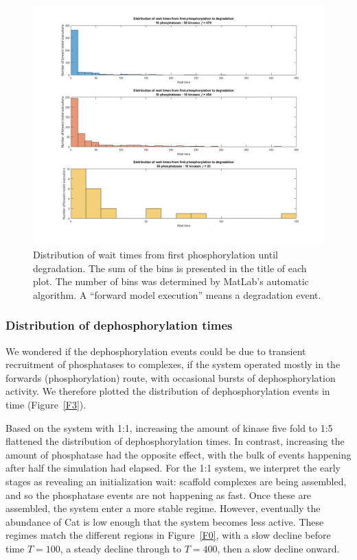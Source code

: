 \begin{figure}[p]
  \centering
  \includegraphics[scale=0.35]{wnt/F2_wait_times}
  \caption{Distribution of wait times from first phosphorylation until
    degradation. The sum of the bins is presented in the title of each
    plot. The number of bins was determined by MatLab's automatic
    algorithm. A “forward model execution” means a degradation event.}
  \label{F2}
\end{figure}

\subsubsection*{Distribution of dephosphorylation times}

We wondered if the dephosphorylation events could be due to transient
recruitment of phosphatases to complexes, if the system operated
mostly in the forwards (phosphorylation) route, with occasional bursts
of dephosphorylation activity. We therefore plotted the distribution
of dephosphorylation events in time (Figure~\ref{F3}).

Based on the system with 1:1, increasing the amount of kinase five
fold to 1:5 flattened the distribution of dephosphorylation times. In
contrast, increasing the amount of phosphatase had the opposite
effect, with the bulk of events happening after half the simulation
had elapsed. For the 1:1 system, we interpret the early stages as
revealing an initialization wait: scaffold complexes are being
assembled, and so the phosphatase events are not happening as
fast. Once these are assembled, the system enter a more stable
regime. However, eventually the abundance of Cat is low enough that
the system becomes less active. These regimes match the different
regions in Figure~\ref{F0}, with a slow decline before time $T=100$, a
steady decline through to $T=400$, then a slow decline onward.


